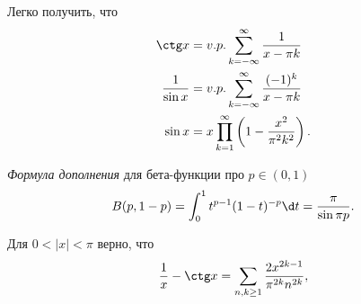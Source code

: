
\begin{to_lem}
     Легко получить, что
    \begin{align*}
        \ctg x
        &=
        v. p. \sum_{k=-\infty}^{\infty} \frac{1}{x-\pi k} \\
        \frac{1}{\sin x}
        &=
         v. p. \sum_{k=-\infty}^{\infty} \frac{(-1)^k}{x-\pi k} \\
        \sin x
        &=
        x \prod_{k=1}^{\infty} \left(
            1 - \frac{x^2}{\pi^2 k^2}
        \right).
    \end{align*}
\end{to_lem}


\begin{to_lem}
    \textit{Формула дополнения} для бета-функции про $p \in (0, 1)$
    \begin{equation*}
        B(p, 1-p) = \int_0^1 t^{p-1} (1-t)^{-p} \d t = \frac{\pi}{\sin \pi p}.
    \end{equation*}
\end{to_lem}

\begin{to_lem}
    Для $0 < |x| < \pi$ верно, что
    \begin{equation*}
        \frac{1}{x} - \ctg x = 
        \sum_{n, k \geq 1} \frac{2 x^{2k-1}}{\pi^{2k} n^{2k}},
    \end{equation*}
\end{to_lem}


